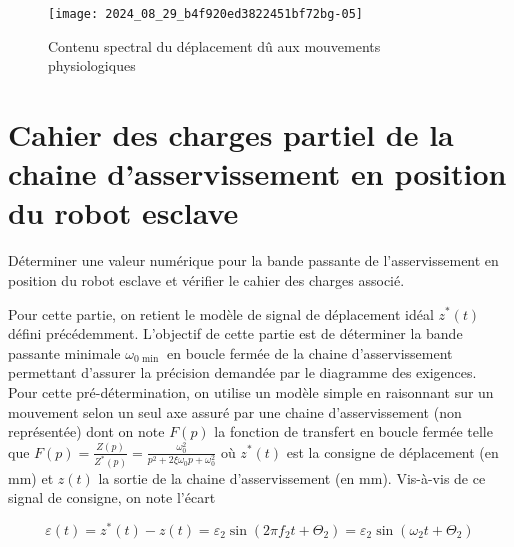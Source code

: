 

\begin{figure}[!h]
\centering
\texttt{[image: 2024\_08\_29\_b4f920ed3822451bf72bg-05]}
\caption{\label{fig_05} Contenu spectral du déplacement dû aux mouvements physiologiques}
\end{figure}


\section{Cahier des charges partiel de la chaine d'asservissement en position du robot esclave}
\begin{obj}
Déterminer une valeur numérique pour la bande passante de l'asservissement en position du robot esclave et vérifier le cahier des charges associé.
\end{obj}

Pour cette partie, on retient le modèle de signal de déplacement idéal $z^{*}(t)$ défini précédemment. L'objectif de cette partie est de déterminer la bande passante minimale $\omega_{0 \text { min }}$ en boucle fermée de la chaine d'asservissement permettant d'assurer la précision demandée par le diagramme des exigences.\\
Pour cette pré-détermination, on utilise un modèle simple en raisonnant sur un mouvement selon un seul axe assuré par une chaine d'asservissement (non représentée) dont on note $F(p)$ la fonction de transfert en boucle fermée telle que $F(p)=\frac{Z(p)}{Z^{*}(p)}=\frac{\omega_{0}^{2}}{p^{2}+2 \xi \omega_{0} p+\omega_{0}^{2}}$ où $z^{*}(t)$ est la consigne de déplacement (en mm) et $z(t)$ la sortie de la chaine d'asservissement (en mm). Vis-à-vis de ce signal de consigne, on note l'écart

$$
\varepsilon(t)=z^{*}(t)-z(t)=\varepsilon_{2} \sin \left(2 \pi f_{2} t+\Theta_{2}\right)=\varepsilon_{2} \sin \left(\omega_{2} t+\Theta_{2}\right)
$$


